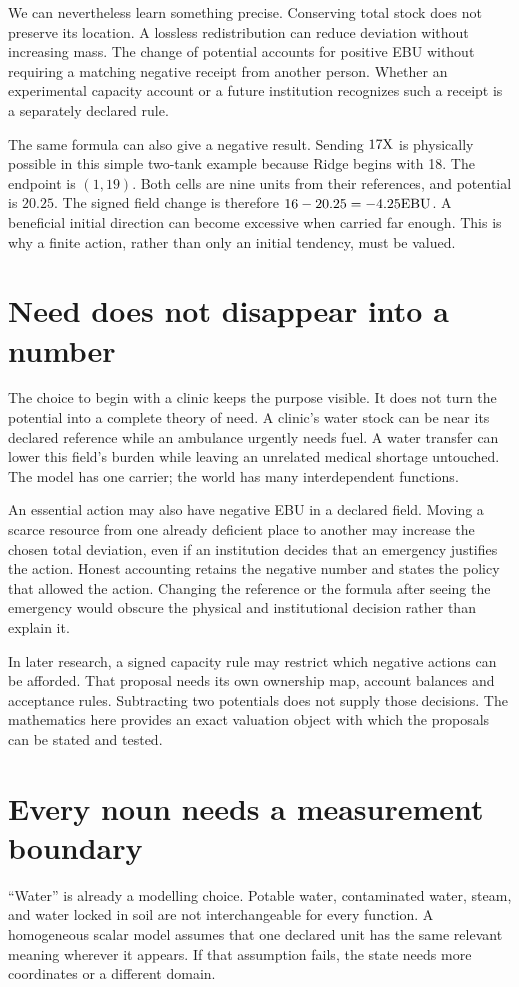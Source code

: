 We can nevertheless learn something precise. Conserving total stock does not preserve its location. A lossless redistribution can reduce deviation without increasing mass. The change of potential accounts for positive EBU without requiring a matching negative receipt from another person. Whether an experimental capacity account or a future institution recognizes such a receipt is a separately declared rule.

The same formula can also give a negative result. Sending \(17\mathrm{X}\) is physically possible in this simple two-tank example because Ridge begins with 18. The endpoint is \((1,19)\). Both cells are nine units from their references, and potential is \(20.25\). The signed field change is therefore \(16-20.25=-4.25\mathrm{EBU}\). A beneficial initial direction can become excessive when carried far enough. This is why a finite action, rather than only an initial tendency, must be valued.

\section{Need does not disappear into a number}
The choice to begin with a clinic keeps the purpose visible. It does not turn the potential into a complete theory of need. A clinic's water stock can be near its declared reference while an ambulance urgently needs fuel. A water transfer can lower this field's burden while leaving an unrelated medical shortage untouched. The model has one carrier; the world has many interdependent functions.

An essential action may also have negative EBU in a declared field. Moving a scarce resource from one already deficient place to another may increase the chosen total deviation, even if an institution decides that an emergency justifies the action. Honest accounting retains the negative number and states the policy that allowed the action. Changing the reference or the formula after seeing the emergency would obscure the physical and institutional decision rather than explain it.

In later research, a signed capacity rule may restrict which negative actions can be afforded. That proposal needs its own ownership map, account balances and acceptance rules. Subtracting two potentials does not supply those decisions. The mathematics here provides an exact valuation object with which the proposals can be stated and tested.

\section{Every noun needs a measurement boundary}
``Water'' is already a modelling choice. Potable water, contaminated water, steam, and water locked in soil are not interchangeable for every function. A homogeneous scalar model assumes that one declared unit has the same relevant meaning wherever it appears. If that assumption fails, the state needs more coordinates or a different domain.


